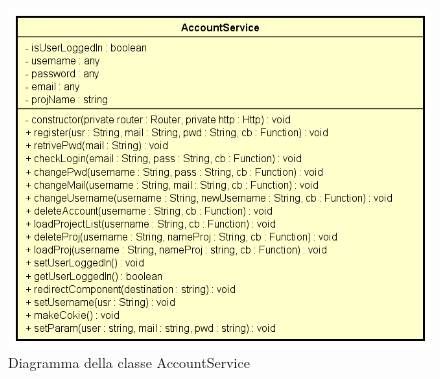 \begin{figure}[h!]
	\centering
	\includegraphics[scale=0.8]{res/sections/SpecificaFrontEnd/Services/Disegnetti/account.png}
	\caption{Diagramma della classe AccountService}
\end{figure}

